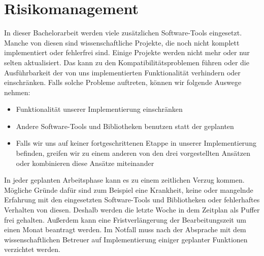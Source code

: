 \section{Risikomanagement}
In dieser Bachelorarbeit werden viele zusätzlichen Software-Tools eingesetzt. Manche von diesen sind wissenschaftliche Projekte, die noch nicht komplett implementiert oder fehlerfrei sind. Einige Projekte werden nicht mehr oder nur selten aktualisiert. Das kann zu den Kompatibilitätsproblemen führen oder die Ausführbarkeit der von uns implementierten Funktionalität verhindern oder einschränken. Falls solche Probleme auftreten, können wir folgende Auswege nehmen:
\begin{itemize}
\item Funktionalität unserer Implementierung einschränken
\item Andere Software-Tools und Bibliotheken benutzen statt der geplanten
\item Falls wir uns auf keiner fortgeschrittenen Etappe in unserer Implementierung befinden, greifen wir zu einem anderen von den drei vorgestellten Ansätzen oder kombinieren diese Ansätze miteinander
\end{itemize}
In jeder geplanten Arbeitsphase kann es zu einem zeitlichen Verzug kommen. Mögliche Gründe dafür sind zum Beispiel eine Krankheit, keine oder mangelnde Erfahrung mit den eingesetzten Software-Tools und Bibliotheken oder fehlerhaftes Verhalten von diesen. Deshalb werden die letzte Woche in dem Zeitplan als Puffer frei gehalten. Außerdem kann eine Fristverlängerung der Bearbeitungszeit um einen Monat beantragt werden. Im Notfall muss nach der Absprache mit dem wissenschaftlichen Betreuer auf Implementierung einiger geplanter Funktionen verzichtet werden.  
